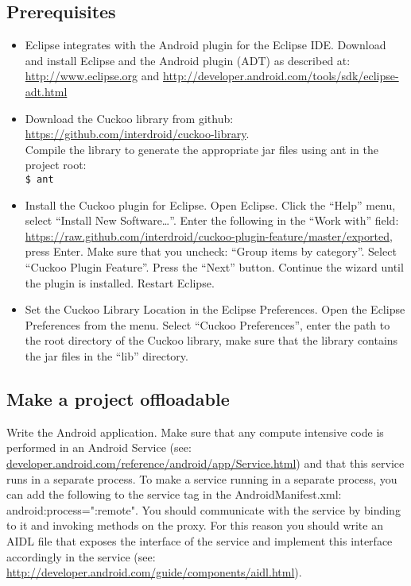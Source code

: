 \documentclass{article}
\begin{document}
\subsection{Prerequisites}
\begin{itemize}
  \item Eclipse integrates with the Android plugin for the Eclipse IDE. Download
  and install Eclipse and the Android plugin (ADT) as described at:
  \url{http://www.eclipse.org} and
  \url{http://developer.android.com/tools/sdk/eclipse-adt.html}
  \item Download the Cuckoo library from github: \\
  \url{https://github.com/interdroid/cuckoo-library}.\\
  Compile the library to
  generate the appropriate jar files using ant in the project root: \\
  \verb!$ ant!\\
  \item Install the Cuckoo plugin for Eclipse. Open Eclipse. Click the ``Help''
  menu, select ``Install New Software\ldots''. Enter the following in the ``Work
  with'' field:
  \url{https://raw.github.com/interdroid/cuckoo-plugin-feature/master/exported}, press Enter.
  Make sure that you uncheck: ``Group items by category''. Select ``Cuckoo
  Plugin Feature''. Press the ``Next'' button. Continue the wizard until the
  plugin is installed. Restart Eclipse.
  \item Set the Cuckoo Library Location in the Eclipse Preferences. Open the
  Eclipse Preferences from the menu. Select ``Cuckoo Preferences'', enter the
  path to the root directory of the Cuckoo library, make sure that the library
  contains the jar files in the ``lib'' directory.
\end{itemize}

\subsection{Make a project offloadable}
Write the Android application. Make sure that any compute intensive code
is performed in an Android Service (see:
\url{developer.android.com/reference/android/app/Service.html}) and that this
service runs in a separate process. To make a service running in a separate process, you can add the following to the service tag in the AndroidManifest.xml:
android:process=":remote". You should communicate with the service by binding to
it and invoking methods on the proxy. For this reason you should write an AIDL
file that exposes the interface of the service and implement this interface
accordingly in the service (see:
\url{http://developer.android.com/guide/components/aidl.html}).
\end{document}
